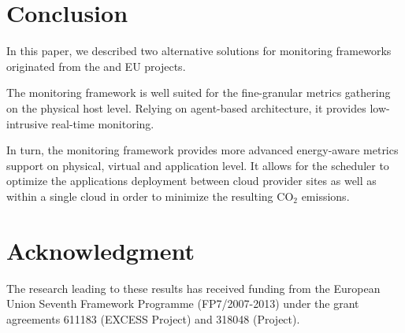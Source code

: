 \documentclass[10pt,letterpaper]{IEEEtran}
\begin{document}
 \section{Conclusion}
\label{sec:conclusion}

\noindent
In this paper, we described two alternative solutions for monitoring frameworks originated from the \ECO and
\EXCESS EU projects.

The \EXCESS monitoring framework is well suited for the fine-granular metrics gathering on the physical host level.
Relying on agent-based architecture, it provides low-intrusive real-time monitoring.

In turn, the \ECO monitoring framework provides more advanced energy-aware metrics support on physical,
virtual and application level. It allows for the scheduler to optimize the applications deployment
between cloud provider sites as well as within a single cloud in order to minimize the resulting $\mathrm{CO_2}$ emissions.


\section*{Acknowledgment}
The research leading to these results has received funding from the European Union
Seventh Framework Programme (FP7/2007-2013) under the grant agreements 611183 (EXCESS Project)
and 318048 (\ECO Project). 

\newcommand{\BIBdecl}{\setlength{\itemsep}{0.28em}}



\end{document}
